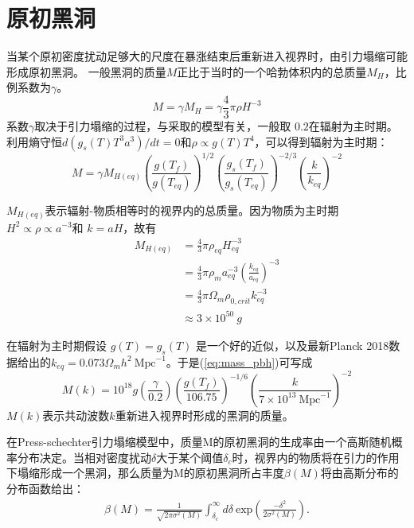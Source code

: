 \section{原初黑洞}
当某个原初密度扰动足够大的尺度在暴涨结束后重新进入视界时，由引力塌缩可能形成原初黑洞。
一般黑洞的质量$M$正比于当时的一个哈勃体积内的总质量$M_H$，比例系数为$\gamma$。
\begin{equation}
    M = \gamma M_H = \gamma \frac{4}{3}\pi\rho H^{-3}
\end{equation}
系数$\gamma$取决于引力塌缩的过程，与采取的模型有关，一般取
$0.2$在辐射为主时期\citep{carr1975primordial}。利用熵守恒$d(g_s(T)T^3a^3)/dt=0$和$\rho\propto
g(T)T^4$，可以得到辐射为主时期：
\begin{equation}
    \label{eq:mass_pbh}
    M=\gamma M_{H(eq)}{\left(\frac{g(T_f)}{g(T_{eq})}\right)}^{1/2}
    {\left(\frac{g_s(T_f)}{g_s(T_{eq})}\right)}^{-2/3}
    {\left(\frac{k}{k_{eq}}\right)}^{-2}
\end{equation}

$M_{H(eq)}$表示辐射-物质相等时的视界内的总质量。因为物质为主时期
$H^2\propto \rho \propto a^{-3}$和 $k=aH$，故有
\begin{align*}
    \label{eq:horizon_mass_eq}
    M_{H(eq)} &= \frac{4}{3}\pi\rho_{eq}H_{eq}^{-3} \\
    &= \frac{4}{3}\pi\rho_m
    a_{eq}^{-3}{\left(\frac{k_{eq}}{a_{eq}}\right)}^{-3}\\
    &= \frac{4}{3}\pi \Omega_m \rho_{0,crit}k^{-3}_{eq} \\
    &\approx 3\times 10^{50}\ g
\end{align*}

在辐射为主时期假设 $g(T)=g_s(T)$
是一个好的近似，以及最新Planck
2018数据\citep{aghanim2018planck}给出的$k_{eq}=0.073\Omega_m
h^2\ \text{Mpc}^{-1}$。于是{(\ref{eq:mass_pbh})}可写成
\begin{equation}
    M(k) =
    10^{18}g\left(\frac{\gamma}{0.2}\right){\left(\frac{g(T_f)}{106.75}\right)}^{-1/6}
    {\left(\frac{k}{7\times10^{13}\ \text{Mpc}^{-1}}\right)}^{-2}
\end{equation}
$M(k)$表示共动波数$k$重新进入视界时形成的黑洞的质量。

在Press-schechter引力塌缩模型中\citep{press1974formation}，质量M的原初黑洞的生成率由一个高斯随机概率分布决定。当相对密度扰动$\delta$大于某个阈值$\delta_c$时，视界内的物质将在引力的作用下塌缩形成一个黑洞，那么质量为M的原初黑洞所占丰度$\beta(M)$将由高斯分布的分布函数给出：
\begin{align}
    \label{eq:mass_fraction_pbh}
    \beta(M) = \frac{1}{\sqrt{2\pi \sigma^2(M)}}\int_{\delta_c}^{\infty}
    d\delta\ \text{exp}\left(\frac{-\delta^2}{2\sigma^2(M)}\right).
\end{align}

